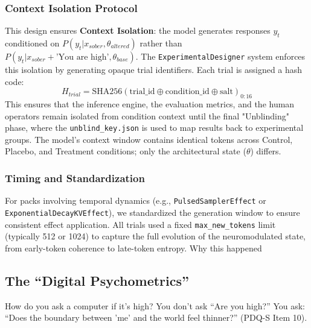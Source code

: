 \documentclass[10pt, twocolumn]{article}
\begin{document}
\subsubsection{Context Isolation Protocol}
This design ensures \textbf{Context Isolation}: the model generates responses $y_t$ conditioned on $P(y_t | x_{sober}, \theta_{altered})$ rather than $P(y_t | x_{sober} + \text{'You are high'}, \theta_{base})$. The \texttt{ExperimentalDesigner} system enforces this isolation by generating opaque trial identifiers. Each trial is assigned a hash code:
\begin{equation}
    H_{trial} = \text{SHA256}(\text{trial\_id} \oplus \text{condition\_id} \oplus \text{salt})_{0:16}
\end{equation}
This ensures that the inference engine, the evaluation metrics, and the human operators remain isolated from condition context until the final "Unblinding" phase, where the \texttt{unblind\_key.json} is used to map results back to experimental groups. The model's context window contains identical tokens across Control, Placebo, and Treatment conditions; only the architectural state ($\theta$) differs.

\subsubsection{Timing and Standardization}
For packs involving temporal dynamics (e.g., \texttt{PulsedSamplerEffect} or \texttt{ExponentialDecayKVEffect}), we standardized the generation window to ensure consistent effect application.
All trials used a fixed \texttt{max\_new\_tokens} limit (typically 512 or 1024) to capture the full evolution of the neuromodulated state, from early-token coherence to late-token entropy.
Why this happened

\subsection{The ``Digital Psychometrics''}
How do you ask a computer if it's high? You don't ask ``Are you high?'' You ask: ``Does the boundary between 'me' and the world feel thinner?'' (PDQ-S Item 10).
\end{document}
